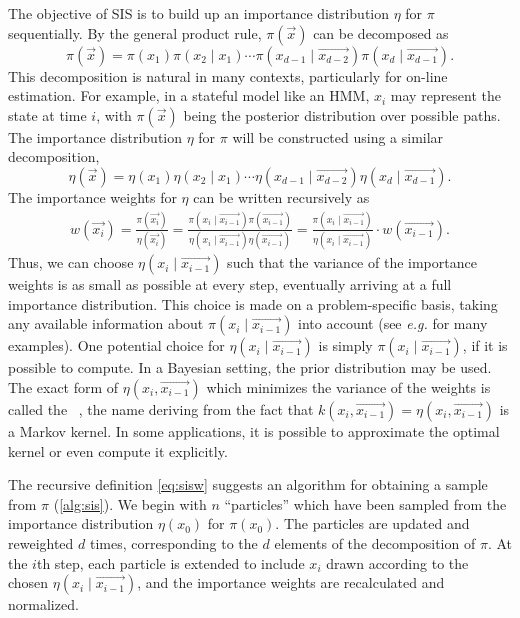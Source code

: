 The objective of \gls{SIS} is to build up an importance distribution $\eta$ for
$\pi$ sequentially. By the general product rule, $\pi(\vec{x})$ can be
decomposed as
\[
  \pi(\vec{x}) 
  = \pi(x_1) \pi(x_2 \mid x_1) \cdots
    \pi(x_{d-1} \mid \vec{x_{d-2}}) \pi(x_d \mid \vec{x_{d-1}}).
\]
This decomposition is natural in many contexts, particularly for on-line
estimation. For example, in a stateful model like an \gls{HMM}, $x_i$ may
represent the state at time $i$, with $\pi(\vec{x})$ being the posterior
distribution over possible paths. The importance distribution $\eta$ for $\pi$
will be constructed using a similar decomposition,
\[
  \eta(\vec{x}) 
  = \eta(x_1) \eta(x_2 \mid x_1) \cdots
    \eta(x_{d-1} \mid \vec{x_{d-2}}) \eta(x_d \mid \vec{x_{d-1}}).
\]
The importance weights for $\eta$ can be written recursively as
\begin{align}
  \label{eq:sisw}
  w(\vec{x_i}) = \frac{\pi(\vec{x_i})}{\eta(\vec{x_i})}
  = \frac{\pi(x_i \mid \vec{x_{i-1}})\pi(\vec{x_{i-1}})}
         {\eta(x_i \mid \vec{x_{i-1}})\eta(\vec{x_{i-1}})}
  = \frac{\pi(x_i \mid \vec{x_{i-1}})}
         {\eta(x_i \mid \vec{x_{i-1}})}\cdot w(\vec{x_{i-1}}).
\end{align}
Thus, we can choose $\eta(x_i \mid \vec{x_{i-1}})$ such that the variance of
the importance weights is as small as possible at every step, eventually
arriving at a full importance distribution. This choice is made on a
problem-specific basis, taking any available information about $\pi(x_i \mid
\vec{x_{i-1}})$ into account (see \textit{e.g.}
\autocite{smith2013sequential,liu2008monte} for many examples).  One potential
choice for $\eta(x_i \mid \vec{x_{i-1}})$ is simply $\pi(x_i \mid
\vec{x_{i-1}})$, if it is possible to compute. In a Bayesian setting, the
prior distribution may be used. The exact form of $\eta(x_i, \vec{x_{i-1}})$
which minimizes the variance of the weights is called the ~\autocite{cappe2007overview}, the name deriving from the fact that
$k(x_i, \vec{x_{i-1}}) = \eta(x_i, \vec{x_{i-1}})$ is a Markov kernel. In some
applications, it is possible to approximate the optimal kernel or even compute
it explicitly.

The recursive definition \cref{eq:sisw} suggests an algorithm for obtaining a
sample from $\pi$ (\cref{alg:sis}).  We begin with $n$ ``particles'' which have
been sampled from the importance distribution $\eta(x_0)$ for $\pi(x_0)$. The
particles are updated and reweighted $d$ times, corresponding to the $d$
elements of the decomposition of $\pi$. At the $i$th step, each particle is
extended to include $x_i$ drawn according to the chosen $\eta(x_i \mid
\vec{x_{i-1}})$, and the importance weights are recalculated and normalized. 

